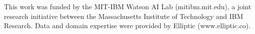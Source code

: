 \documentclass[sigconf,submission]{acmart}
\begin{document}




%
\begin{acks}
This work was funded by the MIT-IBM Watson AI Lab (mitibm.mit.edu), a joint research initiative between the Massachusetts Institute of Technology and IBM Research. Data and domain expertise were provided by Elliptic (www.elliptic.co).
\end{acks}

%


% 

\end{document}
